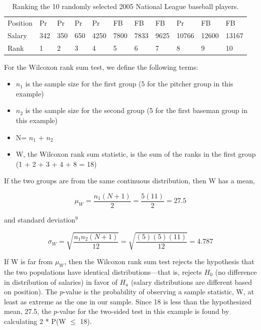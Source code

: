 \documentclass[
]{report}
\providecommand{\tightlist}{%
  \setlength{\itemsep}{0pt}\setlength{\parskip}{0pt}}
\begin{document}
\begin{table}

\caption{\label{tab:table3}Ranking the 10 randomly selected 2005 National League baseball players.}
\centering
\begin{tabular}[t]{lllllllllll}
\toprule
Position & Pr & Pr & Pr & Pr & FB & FB & FB & Pr & FB & FB\\
Salary & 342 & 350 & 650 & 4250 & 7800 & 7833 & 9625 & 10766 & 12600 & 13167\\
Rank & 1 & 2 & 3 & 4 & 5 & 6 & 7 & 8 & 9 & 10\\
\bottomrule
\end{tabular}
\end{table}

For the Wilcoxon rank sum test, we define the following terms:

\begin{itemize}
\tightlist
\item
  \(n_1\) is the sample size for the first group (5 for the pitcher group in this example)
\item
  \(n_2\) is the sample size for the second group (5 for the first baseman group in this example)
\item
  N= \(n_1\) + \(n_2\)
\item
  W, the Wilcoxon rank sum statistic, is the sum of the ranks in the first group
  (1 + 2 + 3 + 4 + 8 = 18)
\end{itemize}

If the two groups are from the same continuous distribution, then W has a mean,

\begin{equation} 
  \mu_W = \frac{n_1(N+1)}{2} = \frac{5(11)}{2}=27.5
  \tag{1.3} \label{eq:1_3}
\end{equation}

and standard deviation\(^9\)

\begin{equation} 
  \sigma_W = \sqrt{\frac{n_1n_2(N+1)}{12}} = \sqrt{\frac{(5)(5)(11)}{12}}= 4.787
  \tag{1.4} \label{eq:1_4}
\end{equation}

If W is far from \(\mu_W\), then the Wilcoxon rank sum test rejects the hypothesis that the two populations have identical distributions---that is, rejects \(H_0\) (no difference in distribution of salaries) in favor of \(H_a\) (salary distributions are different based on position). The \(p\)-value is the probability of observing a sample statistic, W, at least as extreme as the one in our sample. Since 18 is less than the hypothesized mean, 27.5, the \(p\)-value for the two-sided test in this example is found by calculating 2 * P(W \(\leq\) 18).
\end{document}
